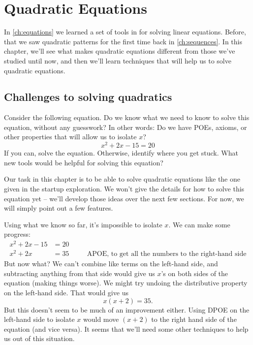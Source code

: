 \chapter{Quadratic Equations}
\label{ch:quadeq}



In \cref{ch:equations} we learned a set of tools in for solving linear equations. Before, that we saw quadratic patterns for the first time back in \cref{ch:sequences}. In this chapter, we'll see what makes quadratic equations different from those we've studied until now, and then we'll learn techniques that will help us to solve quadratic equations.

\section{Challenges to solving quadratics}

\begin{boxedexplore}
Consider the following equation. Do we know what we need to know to solve this equation, without any guesswork? In other words: Do we have POEs, axioms, or other properties that will allow us to isolate $x$?
\[x^2 + 2x - 15 = 20\]
If you can, solve the equation. Otherwise, identify where you get stuck. What new tools would be helpful for solving this equation?
\end{boxedexplore}

Our task in this chapter is to be able to solve quadratic equations like the one given in the startup exploration. We won't give the details for how to solve this equation yet -- we'll develop those ideas over the next few sections. For now, we will simply point out a few features.

Using what we know so far, it's impossible to isolate $x$. We can make some progress:
\[\begin{aligned}
x^2 + 2x - 15 &= 20
\\
x^2 + 2x &= 35
&&\quad\text{APOE, to get all the numbers to the right-hand side}
\end{aligned}\]
But now what? We can't combine like terms on the left-hand side, and subtracting anything from that side would give us $x$'s on both sides of the equation (making things worse). We might try undoing the distributive property on the left-hand side. That would give us
\[x(x+2)=35.\]
But this doesn't seem to be much of an improvement either. Using DPOE on the left-hand side to isolate $x$ would move $(x+2)$ to the right hand side of the equation (and vice versa). It seems that we'll need some other techniques to help us out of this situation.

